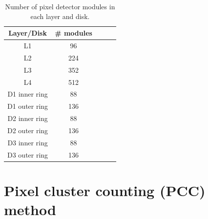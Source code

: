 \begin{table}
  \begin{center}
    \caption[Number of modules in pixel layers and disks]{Number of pixel detector modules in each layer and disk.}
    \begin{tabular}{ccccc}  
    \textbf{Layer/Disk}   & \textbf{\# modules} \\ \hline
     L1      &    96        \\  
       L2    &     224   \\ 
        L3   &       352 \\ 
         L4   &       512 \\ 
         D1 inner ring & 88     \\ 
         D1 outer ring &   136    \\ 
         D2 inner ring &      88 \\ 
         D2 outer ring &   136   \\ 
          D3 inner ring&     88  \\ 
         D3 outer ring &    136  \\ 
      \end{tabular}
    \label{tab:modpix}
  \end{center}
\end{table}


\section{Pixel cluster counting (PCC) method}

